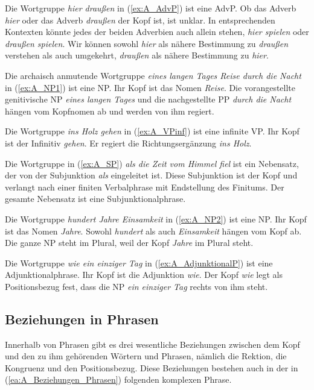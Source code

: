 Die Wortgruppe \textit{hier draußen} in (\ref{ex:A_AdvP}) ist eine AdvP. Ob das Adverb \textit{hier} oder das Adverb \textit{draußen} der Kopf ist, ist unklar. In entsprechenden Kontexten könnte jedes der beiden Adverbien auch allein stehen, \zB \textit{hier spielen} oder \textit{draußen spielen}. Wir können sowohl \textit{hier} als nähere Bestimmung zu \textit{draußen} verstehen als auch umgekehrt, \textit{draußen} als nähere Bestimmung zu \textit{hier}.

Die archaisch anmutende Wortgruppe \textit{eines langen Tages Reise durch die Nacht} in (\ref{ex:A_NP1}) ist eine NP. Ihr Kopf ist das Nomen \textit{Reise}. Die vorangestellte genitivische NP \textit{eines langen Tages} und die nachgestellte PP \textit{durch die Nacht} hängen vom Kopfnomen ab und werden von ihm regiert.

Die Wortgruppe \textit{ins Holz gehen} in (\ref{ex:A_VPinf}) ist eine infinite VP. Ihr Kopf ist der Infinitiv \textit{gehen}. Er regiert die Richtungsergänzung \textit{ins Holz}.

Die Wortgruppe in (\ref{ex:A_SP}) \textit{als die Zeit vom Himmel fiel} ist ein Nebensatz, der von der Subjunktion \textit{als} eingeleitet ist. Diese Subjunktion ist der Kopf und verlangt nach einer finiten Verbalphrase mit Endstellung des Finitums. Der gesamte Nebensatz ist eine Subjunktionalphrase.

Die Wortgruppe \textit{hundert Jahre Einsamkeit} in (\ref{ex:A_NP2}) ist eine NP. Ihr Kopf ist das Nomen \textit{Jahre}. Sowohl \textit{hundert} als auch \textit{Einsamkeit} hängen vom Kopf ab. Die ganze NP steht im Plural, weil der Kopf \textit{Jahre} im Plural steht.

Die Wortgruppe \textit{wie ein einziger Tag} in (\ref{ex:A_AdjunktionalP}) ist eine Adjunktionalphrase. Ihr Kopf ist die Adjunktion \textit{wie}. Der Kopf \textit{wie} legt als Positionsbezug fest, dass die NP \textit{ein einziger Tag} rechts von ihm steht.




\subsection{Beziehungen in Phrasen}\label{subsection:A_Beziehungen_Phrasen}

Innerhalb von Phrasen gibt es drei wesentliche Beziehungen zwischen dem Kopf und den zu ihm gehörenden Wörtern und Phrasen, nämlich die Rektion, die Kongruenz und den Positionsbezug. Diese Beziehungen bestehen auch in der in (\ref{ea:A_Beziehungen_Phrasen}) folgenden komplexen Phrase.   

